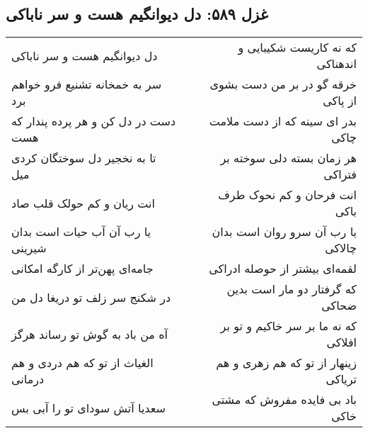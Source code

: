 \begin{center}
\section*{غزل ۵۸۹: دل دیوانگیم هست و سر ناباکی}
\label{sec:589}
\begin{longtable}{l p{0.5cm} r}
دل دیوانگیم هست و سر ناباکی
&&
که نه کاریست شکیبایی و اندهناکی
\\
سر به خمخانه تشنیع فرو خواهم برد
&&
خرقه گو در بر من دست بشوی از پاکی
\\
دست در دل کن و هر پرده پندار که هست
&&
بدر ای سینه که از دست ملامت چاکی
\\
تا به نخجیر دل سوختگان کردی میل
&&
هر زمان بسته دلی سوخته بر فتراکی
\\
انت ریان و کم حولک قلب صاد
&&
انت فرحان و کم نحوک طرف باکی
\\
یا رب آن آب حیات است بدان شیرینی
&&
یا رب آن سرو روان است بدان چالاکی
\\
جامه‌ای پهن‌تر از کارگه امکانی
&&
لقمه‌ای بیشتر از حوصله ادراکی
\\
در شکنج سر زلف تو دریغا دل من
&&
که گرفتار دو مار است بدین ضحاکی
\\
آه من باد به گوش تو رساند هرگز
&&
که نه ما بر سر خاکیم و تو بر افلاکی
\\
الغیاث از تو که هم دردی و هم درمانی
&&
زینهار از تو که هم زهری و هم تریاکی
\\
سعدیا آتش سودای تو را آبی بس
&&
باد بی فایده مفروش که مشتی خاکی
\\
\end{longtable}
\end{center}
